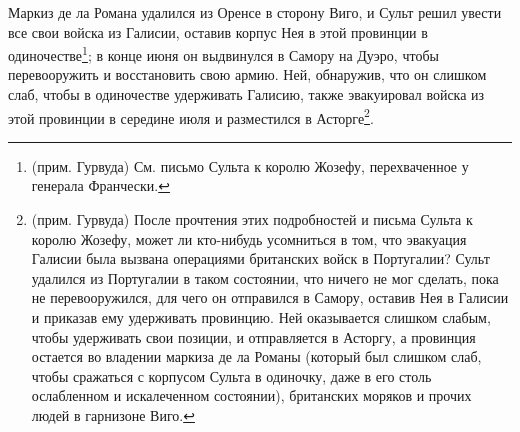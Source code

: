 \documentclass[
  oneside,
  12pt,
  titlepage]{book}
\begin{document}
Маркиз де ла Романа удалился из Оренсе в сторону Виго, и Сульт решил увести все свои войска из Галисии, оставив корпус Нея в этой провинции в одиночестве\footnote{(прим. Гурвуда) См. письмо Сульта к королю Жозефу, перехваченное у генерала Франчески.}; в конце июня он выдвинулся в Самору на Дуэро, чтобы перевооружить и восстановить свою армию. Ней, обнаружив, что он слишком слаб, чтобы в одиночестве удерживать Галисию, также эвакуировал войска из этой провинции в середине июля и разместился в Асторге\footnote{(прим. Гурвуда) После прочтения этих подробностей и письма Сульта к королю Жозефу, может ли кто-нибудь усомниться в том, что эвакуация Галисии была вызвана операциями британских войск в Португалии? Сульт удалился из Португалии в таком состоянии, что ничего не мог сделать, пока не перевооружился, для чего он отправился в Самору, оставив Нея в Галисии и приказав ему удерживать провинцию. Ней оказывается слишком слабым, чтобы удерживать свои позиции, и отправляется в Асторгу, а провинция остается во владении маркиза де ла Романы (который был слишком слаб, чтобы сражаться с корпусом Сульта в одиночку, даже в его столь ослабленном и искалеченном состоянии), британских моряков и прочих людей в гарнизоне Виго.}.
\end{document}
